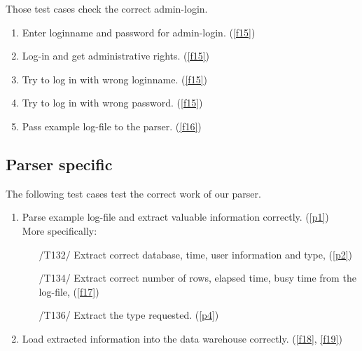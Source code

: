 Those test cases check the correct admin-login.

\begin{enumerate}[resume]

\item Enter loginname and password for admin-login. (\ref{f15})
\label{t17}

\item Log-in and get administrative rights. (\ref{f15})
\label{t18}

\item Try to log in with wrong loginname. (\ref{f15})
\label{t19}

\item Try to log in with wrong password. (\ref{f15})
\label{t20}

\item Pass example log-file to the parser. (\ref{f16})
\label{t21}


\end{enumerate}

\subsection{Parser specific}

The following test cases test the correct work of our parser.

\begin{enumerate}[resume]

\item Parse example log-file and extract valuable information correctly. (\ref{p1})
	\\ More specifically: 
\label{t22}
  \begin{enumerate}

	\item[/T132/] Extract correct database, time, user information 
	and type, (\ref{p2})
\label{t23}

	\item[/T134/] Extract correct number of rows, elapsed time, 
	busy time from the log-file, (\ref{f17})
\label{t24}	
	
	\item[/T136/] Extract the type requested. (\ref{p4})
\label{t25}

  \end{enumerate}

\item Load extracted information into the data warehouse correctly. (\ref{f18}, \ref{f19})
\label{t26}

\end{enumerate}


